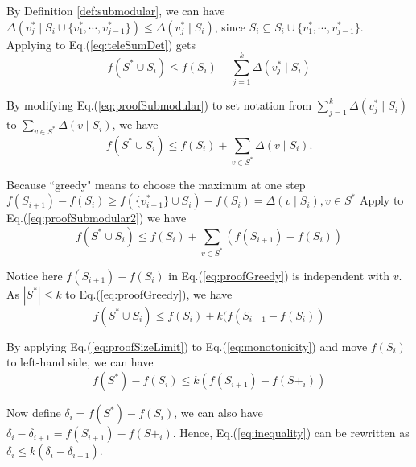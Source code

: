 \documentclass[12pt]{article}
\begin{document}

By Definition \ref{def:submodular}, we can have $ \Delta(v^{*}_{j} \mid S_{i} \cup \{ v^{*}_{1}, \cdots , v^{*}_{j-1} \}) \leq \Delta(v^{*}_{j} \mid S_{i}) $, since $ S_{i} \subseteq S_{i} \cup \{ v^{*}_{1}, \cdots , v^{*}_{j-1} \} $. Applying to Eq.(\ref{eq:teleSumDet}) gets 
\begin{equation}
\label{eq:proofSubmodular}
f(S^{*} \cup S_{i}) \leq f(S_{i}) + \sum_{j=1}^{k} \Delta(v^{*}_{j} \mid S_{i} )
\end{equation}

By modifying Eq.(\ref{eq:proofSubmodular}) to set notation from $ \sum_{j=1}^{k} \Delta(v^{*}_{j} \mid S_{i} ) $ to $ \sum_{v \in S^{*}} \Delta(v \mid S_{i}) $, we have
\begin{equation}
\label{eq:proofSubmodular2}
f(S^{*} \cup S_{i}) \leq f(S_{i}) + \sum_{v \in S^{*}} \Delta(v \mid S_{i}).
\end{equation}

Because ``greedy" means to choose the maximum at one step $ f(S_{i+1}) - f(S_{i}) \geq f( \{ v^{*}_{i+1} \} \cup S_{i} ) - f(S_{i}) = \Delta(v \mid S_{i}), v \in S^{*}  $  Apply to Eq.(\ref{eq:proofSubmodular2}) we have 
\begin{equation}
\label{eq:proofGreedy}
f(S^{*} \cup S_{i}) \leq f(S_{i}) + \sum_{v \in S^{*}} (f(S_{i+1}) - f(S_{i}))
\end{equation}

Notice here $ f(S_{i+1}) - f(S_{i}) $ in Eq.(\ref{eq:proofGreedy}) is independent with $ v $. As $ | S^{*} | \leq k  $ to Eq.(\ref{eq:proofGreedy}), we have
\begin{equation}
\label{eq:proofSizeLimit}
f(S^{*} \cup S_{i}) \leq f(S_{i}) + k(f(S_{i+1} - f(S_{i}))
\end{equation}

By applying Eq.(\ref{eq:proofSizeLimit}) to Eq.(\ref{eq:monotonicity}) and move $ f(S_{i}) $ to left-hand side, we can have
\begin{equation}
\label{eq:inequality}
f(S^{*}) - f(S_{i}) \leq k(f(S_{i+1}) - f(S+_{i}))
\end{equation}

Now define $ \delta_{i} = f(S^{*}) - f(S_{i}) $, we can also have $ \delta_{i} - \delta_{i+1} = f(S_{i+1}) - f(S+_{i}) $. Hence, Eq.(\ref{eq:inequality}) can be rewritten as $ \delta_{i} \leq k(\delta_{i} - \delta_{i+1}) $.
\end{document}
